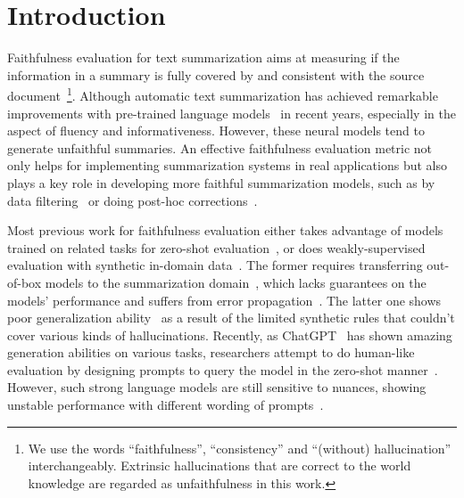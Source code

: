 \section{Introduction}
\label{sec:intro}

Faithfulness evaluation for text summarization aims at measuring if the information in a summary is fully covered by and consistent with the source document~\footnote{We use the words ``faithfulness'', ``consistency'' and ``(without) hallucination'' interchangeably. Extrinsic hallucinations that are correct to the world knowledge are regarded as unfaithfulness in this work.}. Although automatic text summarization has achieved remarkable improvements with pre-trained language models~\cite{zhang2020pegasus,lewis2020bart,LiuJZ21,Liu0Z22Opinion,zhang2023benchmarking} in recent years, especially in the aspect of fluency and informativeness. However, these neural models tend to generate unfaithful summaries. An effective faithfulness evaluation metric not only helps for implementing summarization systems in real applications but also plays a key role in developing more faithful summarization models, such as by data filtering~\cite{matsumaru2020improving} or doing post-hoc corrections~\cite{chaudhury2022x}.


Most previous work for faithfulness evaluation either takes advantage of models trained on related tasks for zero-shot evaluation~\cite{goodrich2019assessing,falke2019ranking,wang2020asking}, or does weakly-supervised evaluation with synthetic in-domain data~\cite{kryscinski2020evaluating}. The former requires transferring out-of-box models to the summarization domain~\cite{mishra2021looking}, which lacks guarantees on the models' performance and suffers from error propagation~\cite{ji2023survey}. The latter one shows poor generalization ability~\cite{laban2022summac} as a result of the limited synthetic rules that couldn't cover various kinds of hallucinations.
Recently, as ChatGPT~\cite{openai2022} has shown amazing generation abilities on various tasks, researchers attempt to do human-like evaluation by designing prompts to query the model in the zero-shot manner~\cite{luo2023chatgpt}. However, such strong language models are still sensitive to nuances, showing unstable performance with different wording of prompts~\cite{gao2023human, chen2023evaluating}.

